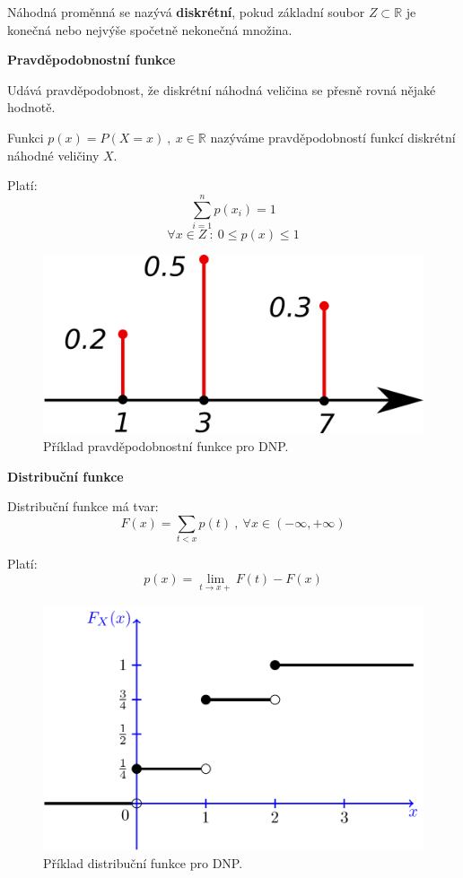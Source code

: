 \begin{compactitem}
    \item Náhodná proměnná se nazývá \textbf{diskrétní}, pokud základní soubor $Z \subset \mathbb{R}$ je konečná nebo nejvýše spočetně nekonečná množina.

    \item \textbf{Pravděpodobnostní funkce} \begin{compactitem}
        \item Udává pravděpodobnost, že diskrétní náhodná veličina se přesně rovná nějaké hodnotě.

        \item Funkci $p(x) = P(X = x) ~,~ x \in \mathbb{R}$ nazýváme pravděpodobností funkcí diskrétní náhodné veličiny $X$.

        \item Platí:
        $$ \sum_{i=1}^n p(x_i) = 1 $$
        $$ \forall x \in Z ~:~ 0 \leq p(x) \leq 1$$
    \end{compactitem}

    \begin{figure}[H]
        \centering
        \includegraphics[width=0.5\linewidth]{dnp_pravdepodobnostni_funkce.png}
        \caption{Příklad pravděpodobnostní funkce pro DNP.}
    \end{figure}

    \item \textbf{Distribuční funkce} \begin{compactitem}
        \item Distribuční funkce má tvar:
        $$ F(x) = \sum_{t < x} p(t) ~,~ \forall x \in (-\infty, +\infty)$$

        \item Platí: 
        $$ p(x) = \lim_{t \rightarrow x+} F(t) - F(x) $$
    \end{compactitem}

    \begin{figure}[H]
        \centering
        \includegraphics[width=0.75\linewidth]{dnp_distribucni_funkce.png}
        \caption{Příklad distribuční funkce pro DNP.}
    \end{figure}


\end{compactitem}
